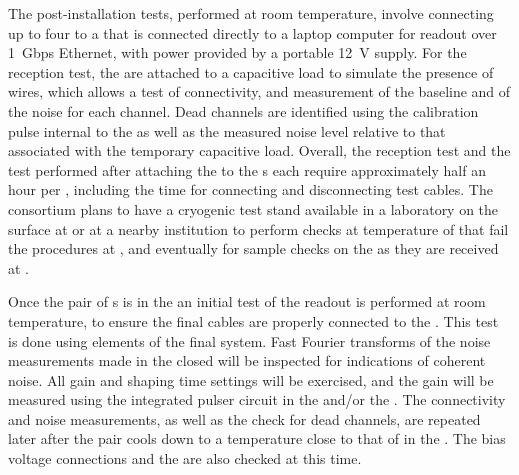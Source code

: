 The post-installation  tests, %
performed at room temperature,  %
involve connecting up to four  to a  that is 
connected directly to a laptop computer for readout over 1~Gbps
Ethernet, with power provided by a portable \SI{12}{V} supply. For 
the reception test, the  are attached to a capacitive 
load to simulate the presence of wires, which allows a test of connectivity, %
and measurement of the baseline and  of the noise for 
each channel. Dead channels are identified using the calibration  pulse internal to the   as well as the measured
noise level relative to that associated with the temporary capacitive load.
Overall, the reception test and the test performed after attaching the
 to the s each require approximately half an hour per , %
including  the time for connecting and disconnecting test cables.
The  consortium plans to have a cryogenic test stand available
in a laboratory on the surface at  or at a nearby institution to perform checks at  temperature
of  that fail the  procedures at ,
and eventually for sample checks on the  as they are received
at .

Once the pair of s is in the \coldbox an initial test of the readout is performed at room temperature, to ensure the final cables are
properly connected to the . This test is done using elements of the final  system.
Fast Fourier transforms of
the noise measurements made in the closed \coldbox will be inspected for indications
of coherent noise. All  gain and shaping time settings will be exercised,
and the gain will be measured using the integrated pulser circuit in the 
 and/or the . The connectivity and noise measurements, as well
as the check for dead channels, are repeated later after the  pair cools
down to a temperature close to that of  in the \coldbox. The bias voltage
connections and the  are also checked at this time.


